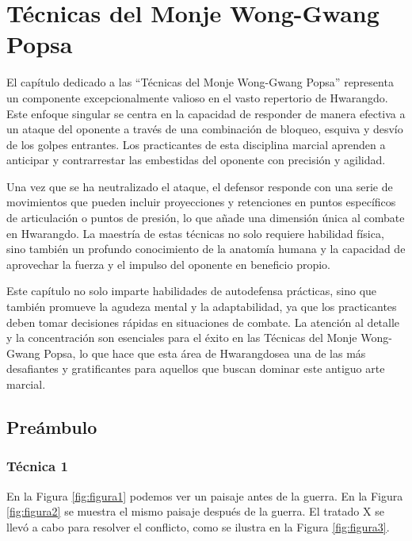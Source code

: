 \chapter{Técnicas del Monje Wong-Gwang Popsa}

El capítulo dedicado a las ``Técnicas del Monje Wong-Gwang Popsa'' representa un componente excepcionalmente valioso en el vasto repertorio de Hwarangdo\textregistered. Este enfoque singular se centra en la capacidad de responder de manera efectiva a un ataque del oponente a través de una combinación de bloqueo, esquiva y desvío de los golpes entrantes. Los practicantes de esta disciplina marcial aprenden a anticipar y contrarrestar las embestidas del oponente con precisión y agilidad.

Una vez que se ha neutralizado el ataque, el defensor responde con una serie de movimientos que pueden incluir proyecciones y retenciones en puntos específicos de articulación o puntos de presión, lo que añade una dimensión única al combate en Hwarangdo\textregistered. La maestría de estas técnicas no solo requiere habilidad física, sino también un profundo conocimiento de la anatomía humana y la capacidad de aprovechar la fuerza y el impulso del oponente en beneficio propio.

Este capítulo no solo imparte habilidades de autodefensa prácticas, sino que también promueve la agudeza mental y la adaptabilidad, ya que los practicantes deben tomar decisiones rápidas en situaciones de combate. La atención al detalle y la concentración son esenciales para el éxito en las Técnicas del Monje Wong-Gwang Popsa, lo que hace que esta área de Hwarangdo\textregistered sea una de las más desafiantes y gratificantes para aquellos que buscan dominar este antiguo arte marcial.

\section{Preámbulo}

\subsection{Técnica 1}

En la Figura \ref{fig:figura1} podemos ver un paisaje antes de la guerra. En la Figura \ref{fig:figura2} se muestra el mismo paisaje después de la guerra. El tratado X se llevó a cabo para resolver el conflicto, como se ilustra en la Figura \ref{fig:figura3}.
\lipsum[1]

